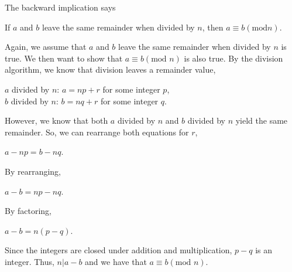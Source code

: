 \documentclass[12pt]{article}
\newenvironment{problem}[2][Problem]{\begin{trivlist}
\item[\hskip \labelsep {\bfseries #1}\hskip \labelsep {\bfseries #2.}]}{\end{trivlist}}
\begin{document}
\begin{problem}{4}
\vspace{.3cm}

\noindent
The backward implication says 
\begin{center}
If $a$ and $b$ leave the same remainder when divided by $n$, then $a \equiv b(\text{mod}n)$.
\end{center}
\noindent
Again, we assume that $a$ and $b$ leave the same remainder when divided by $n$ is true. We then want to show that $a \equiv b(\text{mod }n)$ is also true. By the division algorithm, we know that division leaves a remainder value,
\begin{center}
$a$ divided by $n$: $a=np+r$ for some integer $p$, \\
$b$ divided by $n$: $b=nq+r$ for some integer $q$.
\end{center}
\noindent
However, we know that both $a$ divided by $n$ and $b$ divided by $n$ yield the same remainder. So, we can rearrange both equations for $r$,
\begin{center}
$a-np=b-nq$.
\end{center}
By rearranging,
\begin{center}
$a-b=np-nq$.
\end{center}
\noindent
By factoring,
\begin{center}
$a-b=n(p-q)$.
\end{center}
\noindent
Since the integers are closed under addition and multiplication, $p-q$ is an integer. Thus, $n|a-b$ and we have that $a \equiv b(\text{mod }n)$.
\end{problem}
\end{document}
